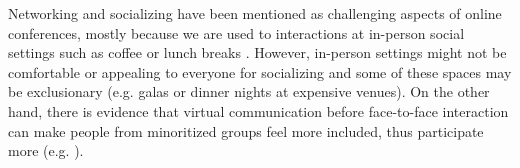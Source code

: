 \documentclass[10pt,letterpaper]{article}
\begin{document}
Networking and socializing have been mentioned as challenging aspects of online conferences, mostly because we are used to interactions at in-person social settings such as coffee or lunch breaks \cite{salibaGettingGripsOnline2020, roosOnlineConferencesNew2020}. 
However, in-person settings might not be comfortable or appealing to everyone for socializing and some of these spaces may be exclusionary (e.g. galas or dinner nights at expensive venues). 
On the other hand, there is evidence that virtual communication before face-to-face interaction can make people from minoritized groups feel more included, thus participate more (e.g. \cite{trianaDoesOrderFacetoFace2012, blackEngenderingBelongingThoughtful2020}). 
\end{document}
